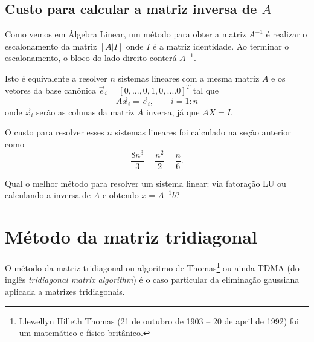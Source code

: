 \subsection{Custo para calcular a matriz inversa de $A$}
Como vemos em Álgebra Linear, um método para obter a matriz $A^{-1}$ é realizar o escalonamento da matriz $[A|I]$ onde $I$ é a matriz identidade. Ao terminar o escalonamento, o bloco do lado direito conterá $A^{-1}$.

Isto é equivalente a resolver $n$ sistemas lineares com a mesma matriz $A$ e os vetores da base canônica $\vec e_i = [0,...,0,1,0,....0]^T$ tal que
$$ A \vec x_i = \vec e_i, \quad\quad i=1:n $$
onde $\vec x_i$ serão as colunas da matriz $A$ inversa, já que $A X=I$.

O custo para resolver esses $n$ sistemas lineares foi calculado na seção anterior como
$$\frac{8n^3}{3}-\frac{n^2}{2}-\frac{n}{6}.$$

\begin{ex}
 Qual o melhor método para resolver um sistema linear: via fatoração LU ou calculando a inversa de $A$ e obtendo $x=A^{-1}b$?
\end{ex}


\section{Método da matriz tridiagonal}
O método da matriz tridiagonal ou algoritmo de Thomas\footnote{Llewellyn Hilleth Thomas (21 de outubro de 1903 – 20 de april de 1992) foi um matemático e físico britânico.} ou ainda TDMA (do inglês {\it tridiagonal matrix algorithm}) é o caso particular da eliminação gaussiana aplicada a matrizes tridiagonais.

